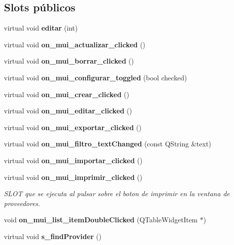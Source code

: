 \subsection*{Slots p\'{u}blicos}
\begin{CompactItemize}
\item 
virtual void {\bf editar} (int)\label{classProveedorList_i0}

\item 
virtual void {\bf on\_\-mui\_\-actualizar\_\-clicked} ()\label{classProveedorList_i1}

\item 
virtual void {\bf on\_\-mui\_\-borrar\_\-clicked} ()
\item 
virtual void {\bf on\_\-mui\_\-configurar\_\-toggled} (bool checked)\label{classProveedorList_i3}

\item 
virtual void {\bf on\_\-mui\_\-crear\_\-clicked} ()\label{classProveedorList_i4}

\item 
virtual void {\bf on\_\-mui\_\-editar\_\-clicked} ()\label{classProveedorList_i5}

\item 
virtual void {\bf on\_\-mui\_\-exportar\_\-clicked} ()\label{classProveedorList_i6}

\item 
virtual void {\bf on\_\-mui\_\-filtro\_\-text\-Changed} (const QString \&text)\label{classProveedorList_i7}

\item 
virtual void {\bf on\_\-mui\_\-importar\_\-clicked} ()\label{classProveedorList_i8}

\item 
virtual void {\bf on\_\-mui\_\-imprimir\_\-clicked} ()\label{classProveedorList_i9}

\begin{CompactList}\small\item\em SLOT que se ejecuta al pulsar sobre el boton de imprimir en la ventana de proveedores. \item\end{CompactList}\item 
void {\bf on\_\-mui\_\-list\_\-item\-Double\-Clicked} (QTable\-Widget\-Item $\ast$)\label{classProveedorList_i10}

\item 
virtual void {\bf s\_\-find\-Provider} ()\label{classProveedorList_i11}

\end{CompactItemize}
